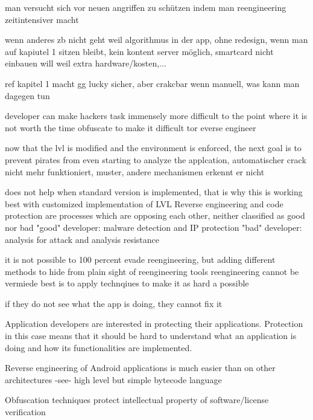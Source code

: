 man versucht sich vor neuen angriffen zu schützen indem man reengineering zeitintensiver macht


wenn anderes zb nicht geht weil algorithmus in der app, ohne redesign, wenn man auf kapiutel 1 sitzen bleibt, kein kontent server möglich, smartcard nicht einbauen will weil extra hardware/kosten,...

ref kapitel 1 macht gg lucky sicher, aber crakcbar wenn manuell, was kann man dagegen tun

developer can make hackers task immensely more difficult to the point where it is not worth the time\cite{developersSecuring}
obfuscate to make it difficult tor everse engineer\cite{developersSecuring}

now that the lvl is modified and the environment is enforced, the next goal is to prevent pirates from even starting to analyze the applcation, automatischer crack nicht mehr funktioniert, muster, andere mechanismen erkennt er nicht

does not help when standard version is implemented, that is why this is working best with customized implementation of LVL
%
Reverse engineering and code protection are processes which are opposing each other, neither classified as good nor bad\newline
"good" developer: malware detection and IP protection\newline
"bad" developer: analysis for attack and analysis resistance

\cite{kovachevaMaster}
%
it is not possible to 100 percent evade reengineering, but adding different methods to hide from plain sight of reengineering tools
%
reengineering cannot be vermiede
best is to apply technqiues to make it as hard a possible
\cite{munteanLicense}
%

if they do not see what the app is doing, they cannot fix it

Application developers are interested in protecting their applications. Protection in this case means that it should be hard to understand
what an application is doing and how its functionalities are implemented.\newline


Reverse engineering of Android applications is much easier than on other architectures -see- high level but simple bytecode language\newline

Obfuscation techniques protect intellectual property of software/license verification\newline

